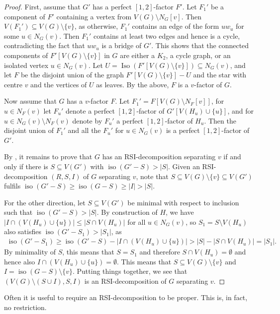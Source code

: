 \documentclass[a4paper,11pt,oneside]{scrartcl}
\theoremstyle{definition}
\theoremstyle{remark}
\DeclareMathOperator{\Iso}{Iso}
\DeclareMathOperator{\iso}{iso}
\begin{document}
\begin{proof}
    First, assume that $G'$ has a perfect $[1,2]$-factor $F'$. Let $F_1'$ be a component of $F'$ containing a vertex from $V(G) \setminus N_{G}[v]$. Then $V(F_1') \subseteq V(G) \setminus \{v\}$, as otherwise, $F_1'$ contains an edge of the form $uw_u$ for some $u \in N_G(v)$.
    Then $F_1'$ contains at least two edges and hence is a cycle, contradicting the fact that $uw_u$ is a bridge of $G'$.
    This shows that the connected components of $F'[V(G) \setminus \{v\}]$ in $G$ are either a $K_2$, a cycle graph, or an isolated vertex $u \in N_G(v)$. Let $U = \Iso(F'[V(G) \setminus \{v\}]) \subseteq N_G(v)$, and let $F$ be the disjoint union of the graph $F'[V(G) \setminus \{v\}] - U$ and the star with centre $v$ and the vertices of $U$ as leaves. By the above, $F$ is a $v$-factor of $G$.
    
    Now assume that $G$ has a $v$-factor $F$. Let $F_1' = F[V(G)\setminus N_{F}[v]]$, for $u \in N_F(v)$ let $F_u'$ denote a perfect $[1,2]$-factor of $G'[V(H_u) \cup \{u\}]$, and for $u \in N_G(v) \setminus N_F(v)$ denote by $F_u'$ a perfect $[1,2]$-factor of $H_u$. Then the disjoint union of $F_1'$ and all the $F_u'$ for $u \in N_G(v)$ is a perfect $[1,2]$-factor of $G'$.
    
    By , it remains to prove that $G$ has an RSI-decomposition separating $v$ if and only if there is $S \subseteq V(G')$ with $\iso(G'-S) > |S|$. Given an RSI-decomposition $(R,S,I)$ of $G$ separating $v$, note that $S \subseteq V(G) \setminus \{v\} \subseteq V(G')$ fulfils $\iso(G'-S) \geq \iso(G-S) \geq |I| > |S|$.
    
    For the other direction, let $S \subseteq V(G')$ be minimal with respect to inclusion such that $\iso(G'-S) > |S|$. By construction of $H$, we have $|I\cap (V(H_u)\cup \{u\})| \leq |S\cap V(H_u)|$ for all $u\in N_G(v)$, so $S_1=S\setminus V(H_u)$ also satisfies $\iso(G'-S_1)>|S_1|$, as
        \begin{align*}
            \iso(G'-S_1) \geq \iso(G'-S)-|I\cap (V(H_u)\cup \{u\})| > |S| - |S\cap V(H_u)| = |S_1|.
        \end{align*}
    By minimality of $S$, this means that $S=S_1$ and therefore $S\cap V(H_u) = \emptyset$ and hence also $I\cap (V(H_u)\cup \{u\}) =\emptyset$. This means that $S \subseteq V(G)\setminus \{v\}$ and $I = \iso(G-S) \setminus \{v\}$. Putting things together, we see that $(V(G) \setminus (S \cup I), S, I)$ is an RSI-decomposition of $G$ separating $v$.
\end{proof}
Often it is useful to require an RSI-decomposition to be proper. This is, in fact, no restriction.
\end{document}
